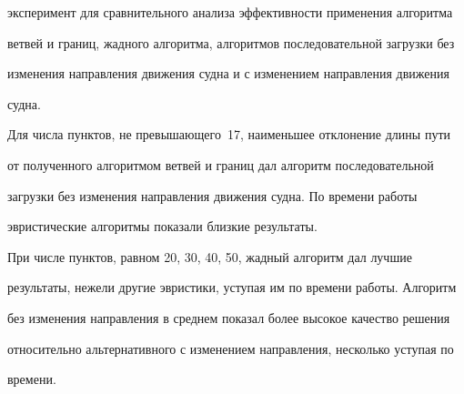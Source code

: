 эксперимент для сравнительного анализа эффективности применения алгоритма 


ветвей и границ, жадного алгоритма, алгоритмов последовательной загрузки без 


изменения направления движения судна и с изменением направления движения 


судна.


  


  Для числа пунктов, не превышающего~17, наименьшее отклонение длины пути 


от полученного алгоритмом ветвей и границ дал алгоритм последовательной 


загрузки без изменения направления движения судна. По времени работы 


эвристические алгоритмы показали близкие результаты.


  


  При числе пунктов, равном 20, 30, 40, 50, жадный алгоритм дал лучшие 


результаты, нежели другие эвристики, уступая им по времени работы. Алгоритм 


без изменения направления в среднем показал более высокое качество решения 


относительно альтернативного с изменением направления, несколько уступая по 


времени. 





